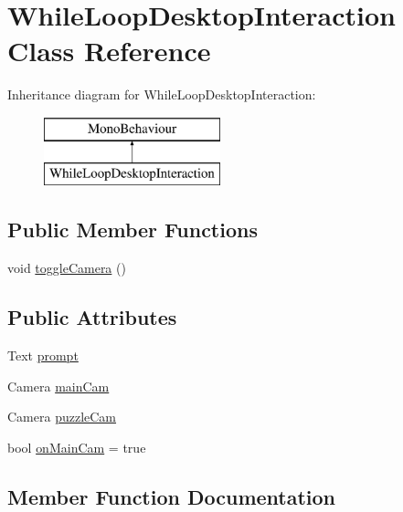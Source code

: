 \hypertarget{class_while_loop_desktop_interaction}{}\section{While\+Loop\+Desktop\+Interaction Class Reference}
\label{class_while_loop_desktop_interaction}
Inheritance diagram for While\+Loop\+Desktop\+Interaction\+:\begin{figure}[H]
\begin{center}
\leavevmode
\includegraphics[height=2.000000cm]{class_while_loop_desktop_interaction}
\end{center}
\end{figure}
\subsection*{Public Member Functions}
\begin{DoxyCompactItemize}
\item 
void \hyperlink{class_while_loop_desktop_interaction_a0f02cea34c5163b343a80c3f0f496c89}{toggle\+Camera} ()
\end{DoxyCompactItemize}
\subsection*{Public Attributes}
\begin{DoxyCompactItemize}
\item 
Text \hyperlink{class_while_loop_desktop_interaction_a4e91a441755c264f24e75213d85be4cc}{prompt}
\item 
Camera \hyperlink{class_while_loop_desktop_interaction_ae9eb37f3c34565d4543fa78bfe64654c}{main\+Cam}
\item 
Camera \hyperlink{class_while_loop_desktop_interaction_aa8ae2d0ac0055053eb63436135108f7d}{puzzle\+Cam}
\item 
bool \hyperlink{class_while_loop_desktop_interaction_abf11f0b6e3679b9b07532f33e5522242}{on\+Main\+Cam} = true
\end{DoxyCompactItemize}


\subsection{Member Function Documentation}
\mbox{\label{class_while_loop_desktop_interaction_a0f02cea34c5163b343a80c3f0f496c89}} 
